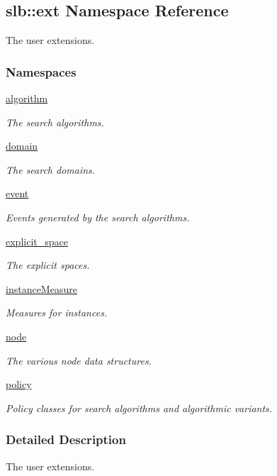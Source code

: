 \hypertarget{namespaceslb_1_1ext}{}\subsection{slb\+:\+:ext Namespace Reference}
\label{namespaceslb_1_1ext}


The user extensions.  


\subsubsection*{Namespaces}
\begin{DoxyCompactItemize}
\item 
 \hyperlink{namespaceslb_1_1ext_1_1algorithm}{algorithm}
\begin{DoxyCompactList}\small\item\em The search algorithms. \end{DoxyCompactList}\item 
 \hyperlink{namespaceslb_1_1ext_1_1domain}{domain}
\begin{DoxyCompactList}\small\item\em The search domains. \end{DoxyCompactList}\item 
 \hyperlink{namespaceslb_1_1ext_1_1event}{event}
\begin{DoxyCompactList}\small\item\em Events generated by the search algorithms. \end{DoxyCompactList}\item 
 \hyperlink{namespaceslb_1_1ext_1_1explicit__space}{explicit\+\_\+space}
\begin{DoxyCompactList}\small\item\em The explicit spaces. \end{DoxyCompactList}\item 
 \hyperlink{namespaceslb_1_1ext_1_1instanceMeasure}{instance\+Measure}
\begin{DoxyCompactList}\small\item\em Measures for instances. \end{DoxyCompactList}\item 
 \hyperlink{namespaceslb_1_1ext_1_1node}{node}
\begin{DoxyCompactList}\small\item\em The various node data structures. \end{DoxyCompactList}\item 
 \hyperlink{namespaceslb_1_1ext_1_1policy}{policy}
\begin{DoxyCompactList}\small\item\em Policy classes for search algorithms and algorithmic variants. \end{DoxyCompactList}\end{DoxyCompactItemize}


\subsubsection{Detailed Description}
The user extensions. 